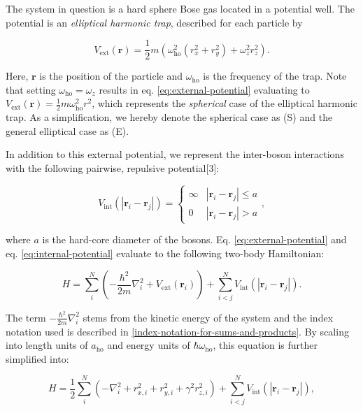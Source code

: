 \documentclass[
]{article}
\begin{document}
The system in question is a hard sphere Bose gas located in a potential
well. The potential is an \emph{elliptical harmonic trap}, described for
each particle by

\begin{equation}V_\text{ext}(\mathbf r) = \frac{1}{2}m\left(\omega_\text{ho}^2(r_x^2 + r_y^2) + \omega_z^2 r_z^2\right).\label{eq:external-potential}\end{equation}

Here, \(\mathbf r\) is the position of the particle and
\(\omega_\text{ho}\) is the frequency of the trap. Note that setting
\(\omega_\text{ho} = \omega_z\) results in eq.
\eqref{eq:external-potential} evaluating to
\(V_\text{ext}(\mathbf r) = \frac{1}{2}m\omega_\text{ho}^2r^2\), which
represents the \emph{spherical} case of the elliptical harmonic trap. As
a simplification, we hereby denote the spherical case as (S) and the
general elliptical case as (E).

In addition to this external potential, we represent the inter-boson
interactions with the following pairwise, repulsive potential{[}3{]}:

\begin{equation}V_\text{int}(|\mathbf r_i - \mathbf r_j|) = \begin{cases}\infty & |\mathbf r_i - \mathbf r_j| \le a \\ 0 & |\mathbf r_i - \mathbf r_j| > a\end{cases},\label{eq:internal-potential}\end{equation}

where \(a\) is the hard-core diameter of the bosons. Eq.
\eqref{eq:external-potential} and eq. \eqref{eq:internal-potential}
evaluate to the following two-body Hamiltonian:

\begin{equation}H = \sum_i^N\left(-\frac{\hbar^2}{2m}\nabla_i^2 + V_\text{ext}(\mathbf r_i)\right) + \sum_{i < j}^N V_\text{int} (|\mathbf r_i - \mathbf r_j|).\label{eq:hamiltonian}\end{equation}

The term \(-\frac{\hbar^2}{2m}\nabla_i^2\) stems from the kinetic energy
of the system and the index notation used is described in
\ref{index-notation-for-sums-and-products}. By scaling into length units
of \(a_\text{ho}\) and energy units of \(\hbar\omega_\text{ho}\), this
equation is further simplified into:

\begin{equation} H = \frac{1}{2}\sum_i^N \left(-\nabla_i^2 + r_{x, i}^2 + r_{y, i}^2 + \gamma^2 r_{z, i}^2\right) + \sum_{i<j}^N V_\text{int}(|\mathbf r_i - \mathbf r_j|) ,\label{eq:scaled_ham}\end{equation}
\end{document}
